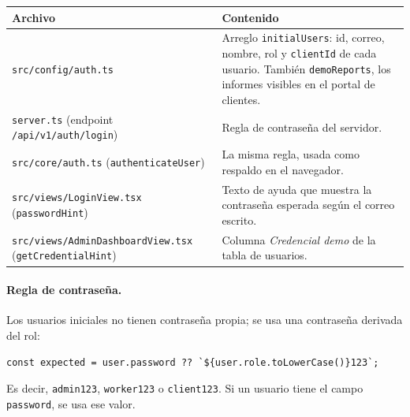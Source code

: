 \documentclass[11pt,a4paper]{article}
\newcommand{\ruta}[1]{\texttt{#1}}
\begin{document}
\begin{center}
\begin{tabularx}{\linewidth}{lX}
\toprule
\textbf{Archivo} & \textbf{Contenido} \\
\midrule
\ruta{src/config/auth.ts} &
  Arreglo \texttt{initialUsers}: id, correo, nombre, rol y \texttt{clientId} de cada
  usuario. También \texttt{demoReports}, los informes visibles en el portal de clientes. \\
\ruta{server.ts} (endpoint \texttt{/api/v1/auth/login}) &
  Regla de contraseña del servidor. \\
\ruta{src/core/auth.ts} (\texttt{authenticateUser}) &
  La misma regla, usada como respaldo en el navegador. \\
\ruta{src/views/LoginView.tsx} (\texttt{passwordHint}) &
  Texto de ayuda que muestra la contraseña esperada según el correo escrito. \\
\ruta{src/views/AdminDashboardView.tsx} (\texttt{getCredentialHint}) &
  Columna \emph{Credencial demo} de la tabla de usuarios. \\
\bottomrule
\end{tabularx}
\end{center}

\paragraph{Regla de contraseña.} Los usuarios iniciales no tienen contraseña propia; se
usa una contraseña derivada del rol:
\begin{lstlisting}
const expected = user.password ?? `${user.role.toLowerCase()}123`;
\end{lstlisting}
Es decir, \texttt{admin123}, \texttt{worker123} o \texttt{client123}. Si un usuario tiene
el campo \texttt{password}, se usa ese valor.
\end{document}

